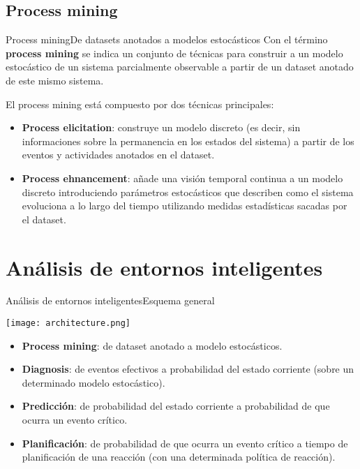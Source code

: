 \documentclass[9pt, handout]{beamer}
\begin{document}
    \subsection{Process mining}
      \begin{frame}{Process mining}{De datasets anotados a modelos estocásticos}
        Con el término \textbf{process mining} se indica un conjunto de técnicas para construir a un modelo estocástico de un sistema parcialmente observable a partir de un dataset anotado de este mismo sistema.
        
        \vspace{1em}
        El process mining está compuesto por dos técnicas principales:
        \begin{itemize}
          \item \textbf{Process elicitation}: construye un modelo discreto (es decir, sin informaciones sobre la permanencia en los estados del sistema) a partir de los eventos y actividades anotados en el dataset.
          \item \textbf{Process ehnancement}: añade una visión temporal continua a un modelo discreto introduciendo parámetros estocásticos que describen como el sistema evoluciona a lo largo del tiempo utilizando medidas estadísticas sacadas por el dataset.
        \end{itemize}
      \end{frame}
    
  \section{Análisis de entornos inteligentes}
  
    \begin{frame}{Análisis de entornos inteligentes}{Esquema general}
      \vspace{-1em}
      \begin{center}
        \texttt{[image: architecture.png]}
      \end{center}
      
      \begin{itemize}
        \item \textbf{Process mining}: de dataset anotado a modelo estocásticos.
        \item \textbf{Diagnosis}: de eventos efectivos a probabilidad del estado corriente (sobre un determinado modelo estocástico).
        \item \textbf{Predicción}: de probabilidad del estado corriente a probabilidad de que ocurra un evento crítico.
        \item \textbf{Planificación}: de probabilidad de que ocurra un evento crítico a tiempo de planificación de una reacción (con una determinada política de reacción).
      \end{itemize}
    \end{frame}
  
\end{document}
